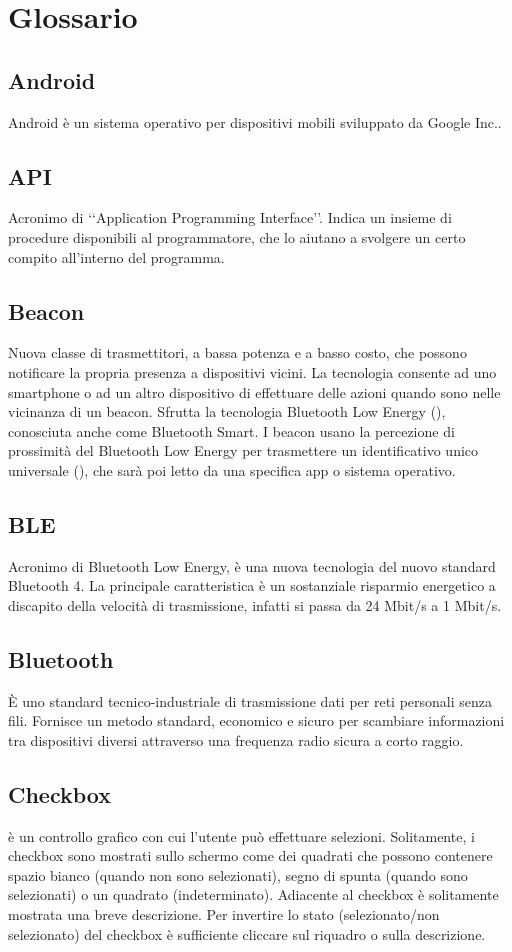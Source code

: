 \section{Glossario}
\subsection{Android}
Android è un sistema operativo per dispositivi mobili sviluppato da Google Inc..
\subsection{API}
Acronimo di ‘‘Application Programming Interface’’. Indica un insieme di procedure disponibili al programmatore, che lo aiutano a svolgere un certo compito all'interno del programma.
\subsection{Beacon}
Nuova classe di trasmettitori, a bassa potenza e a basso costo, che possono notificare la propria presenza a dispositivi vicini. La tecnologia consente ad uno smartphone o ad un altro dispositivo di effettuare delle azioni quando sono nelle vicinanza di un beacon. Sfrutta la tecnologia Bluetooth Low Energy (), conosciuta anche come Bluetooth Smart. I beacon usano la percezione di prossimità del Bluetooth Low Energy per trasmettere un identificativo unico universale (), che sarà poi letto da una specifica app o sistema operativo.
\subsection{BLE}
Acronimo di Bluetooth Low Energy, è una nuova tecnologia del nuovo standard Bluetooth 4. La principale caratteristica è un sostanziale risparmio energetico a discapito della velocità di trasmissione, infatti si passa da 24 Mbit/s a 1 Mbit/s.
\subsection{Bluetooth}
È uno standard tecnico-industriale di trasmissione dati per reti personali senza fili. Fornisce un metodo standard, economico e sicuro per scambiare informazioni tra dispositivi diversi attraverso una frequenza radio sicura a corto raggio.
\subsection{Checkbox}
è un controllo grafico con cui l'utente può effettuare selezioni. Solitamente, i checkbox sono mostrati sullo schermo come dei quadrati che possono contenere spazio bianco (quando non sono selezionati), segno di spunta (quando sono selezionati) o un quadrato (indeterminato). Adiacente al checkbox è solitamente mostrata una breve descrizione. Per invertire lo stato (selezionato/non selezionato) del checkbox è sufficiente cliccare sul riquadro o sulla descrizione.
